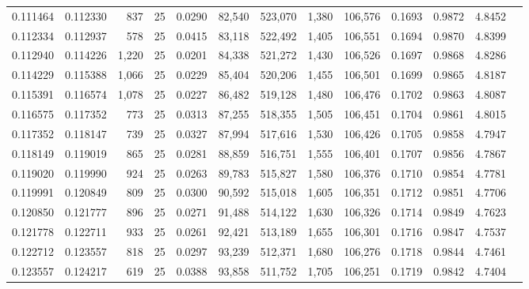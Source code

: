 \begin{tabular}{rrrrrrrrrrrrr}
0.111464 & 0.112330 &   837 &  25 &                                     0.0290 &  82,540 & 523,070 &   1,380 & 106,576 & 0.1693 & 0.9872 & 4.8452 \\
0.112334 & 0.112937 &   578 &  25 &                                     0.0415 &  83,118 & 522,492 &   1,405 & 106,551 & 0.1694 & 0.9870 & 4.8399 \\
0.112940 & 0.114226 & 1,220 &  25 &                                     0.0201 &  84,338 & 521,272 &   1,430 & 106,526 & 0.1697 & 0.9868 & 4.8286 \\
0.114229 & 0.115388 & 1,066 &  25 &                                     0.0229 &  85,404 & 520,206 &   1,455 & 106,501 & 0.1699 & 0.9865 & 4.8187 \\
0.115391 & 0.116574 & 1,078 &  25 &                                     0.0227 &  86,482 & 519,128 &   1,480 & 106,476 & 0.1702 & 0.9863 & 4.8087 \\
0.116575 & 0.117352 &   773 &  25 &                                     0.0313 &  87,255 & 518,355 &   1,505 & 106,451 & 0.1704 & 0.9861 & 4.8015 \\
0.117352 & 0.118147 &   739 &  25 &                                     0.0327 &  87,994 & 517,616 &   1,530 & 106,426 & 0.1705 & 0.9858 & 4.7947 \\
0.118149 & 0.119019 &   865 &  25 &                                     0.0281 &  88,859 & 516,751 &   1,555 & 106,401 & 0.1707 & 0.9856 & 4.7867 \\
0.119020 & 0.119990 &   924 &  25 &                                     0.0263 &  89,783 & 515,827 &   1,580 & 106,376 & 0.1710 & 0.9854 & 4.7781 \\
0.119991 & 0.120849 &   809 &  25 &                                     0.0300 &  90,592 & 515,018 &   1,605 & 106,351 & 0.1712 & 0.9851 & 4.7706 \\
0.120850 & 0.121777 &   896 &  25 &                                     0.0271 &  91,488 & 514,122 &   1,630 & 106,326 & 0.1714 & 0.9849 & 4.7623 \\
0.121778 & 0.122711 &   933 &  25 &                                     0.0261 &  92,421 & 513,189 &   1,655 & 106,301 & 0.1716 & 0.9847 & 4.7537 \\
0.122712 & 0.123557 &   818 &  25 &                                     0.0297 &  93,239 & 512,371 &   1,680 & 106,276 & 0.1718 & 0.9844 & 4.7461 \\
0.123557 & 0.124217 &   619 &  25 &                                     0.0388 &  93,858 & 511,752 &   1,705 & 106,251 & 0.1719 & 0.9842 & 4.7404 \\

\end{tabular}
